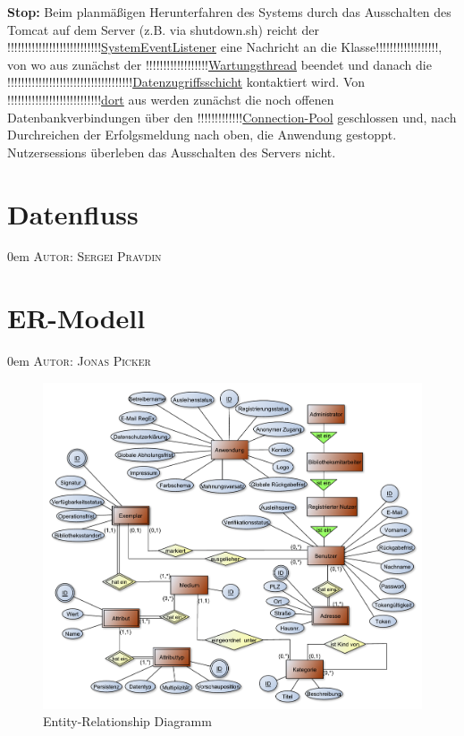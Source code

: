 \documentclass{article}
\makeatletter
\newcommand{\sectionauthor}[1]{
	{\parindent 0em \large \scshape Autor: #1 \par \nobreak \vspace*{1em}}
	\@afterheading
}
\makeatother
\begin{document}
\textbf{Stop:} 
Beim planmäßigen Herunterfahren des Systems durch das Ausschalten des Tomcat auf dem Server (z.B. via shutdown.sh) reicht der !!!!!!!!!!!!!!!!!!!!!!!!!!!\hyperlink{}{SystemEventListener} eine Nachricht an die Klasse!!!!!!!!!!!!!!!!!!\hyperlink{}{}, von wo aus zunächst der !!!!!!!!!!!!!!!!!!\hyperlink{}{Wartungsthread} beendet und danach die !!!!!!!!!!!!!!!!!!!!!!!!!!!!!!!!!!!!\hyperlink{}{Datenzugriffsschicht} kontaktiert wird. Von !!!!!!!!!!!!!!!!!!!!!!!!!!!\hyperlink{}{dort} aus werden zunächst die noch offenen Datenbankverbindungen über den !!!!!!!!!!!!!\hyperlink{}{Connection-Pool} geschlossen und, nach Durchreichen der Erfolgsmeldung nach oben, die Anwendung gestoppt. Nutzersessions überleben das Ausschalten des Servers nicht.
\section{Datenfluss}
\sectionauthor{Sergei Pravdin}

\section{ER-Modell}
\sectionauthor{Jonas Picker}


\begin{figure}[h]
    \centering
    \includegraphics[angle = 270, width = 60em]{ER-Diagramm}
    \caption{Entity-Relationship Diagramm}
    \label{ER-Diagramm}
\end{figure}
\end{document}
